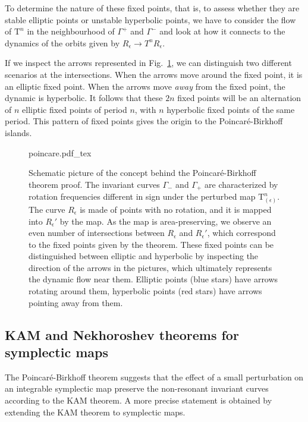 To determine the nature of these fixed points, that is, to assess whether they are stable elliptic points or unstable hyperbolic points, we have to consider the flow of $\mathrm{T}^n$ in the neighbourhood of $\Gamma^+$ and $\Gamma^-$ and look at how it connects to the dynamics of the orbits given by $R_\epsilon \to T^n R_\epsilon$.

If we inspect the arrows represented in Fig.~\ref{fig:tnepsilon}, we can distinguish two different scenarios at the intersections. When the arrows move around the fixed point, it is an elliptic fixed point. When the arrows move \textit{away} from the fixed point, the dynamic is hyperbolic. It follows that these $2n$ fixed points will be an alternation of $n$ elliptic fixed points of period $n$, with $n$ hyperbolic fixed points of the same period. This pattern of fixed points gives the origin to the Poincaré-Birkhoff islands.

\begin{figure}
	\centering
	\def\svgwidth{0.75\columnwidth}
    {poincare.pdf_tex}
    \caption{Schematic picture of the concept behind the Poincaré-Birkhoff theorem proof. The invariant curves $\Gamma_-$ and $\Gamma_+$ are characterized by rotation frequencies different in sign under the perturbed map $\mathrm{T}^n_(\epsilon)$. The curve $R_\epsilon$ is made of points with no rotation, and it is mapped into $R_\epsilon'$ by the map. As the map is area-preserving, we observe an even number of intersections between $R_\epsilon$ and $R_\epsilon'$, which correspond to the fixed points given by the theorem. These fixed points can be distinguished between elliptic and hyperbolic by inspecting the direction of the arrows in the pictures, which ultimately represents the dynamic flow near them. Elliptic points (blue stars) have arrows rotating around them, hyperbolic points (red stars) have arrows pointing away from them.}
    \label{fig:tnepsilon}
\end{figure}

\subsection{KAM and Nekhoroshev theorems for symplectic maps}

The Poincaré-Birkhoff theorem suggests that the effect of a small perturbation on an integrable symplectic map preserve the non-resonant invariant curves according to the KAM theorem. A more precise statement  is obtained by extending the KAM theorem to symplectic maps.

